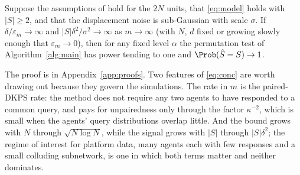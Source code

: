 \begin{proposition}
\label{prop:consistency}
Suppose the assumptions of \citet[Theorem~1]{pkps2026} hold for the $2N$ units, that \eqref{eq:model} holds with $|S|\ge 2$, and that the displacement noise is sub-Gaussian with scale $\sigma$. If $\delta/\varepsilon_m\to\infty$ and $|S|\delta^2/\sigma^2\to\infty$ as $m\to\infty$ (with $N$, $d$ fixed or growing slowly enough that $\varepsilon_m\to 0$), then for any fixed level $\alpha$ the permutation test of Algorithm~\ref{alg:main} has power tending to one and $\Prob(\hat S = S)\to 1$.
\end{proposition}

The proof is in Appendix~\ref{app:proofs}. Two features of \eqref{eq:conc} are worth drawing out because they govern the simulations. The rate in $m$ is the paired-DKPS rate: the method does not require any two agents to have responded to a common query, and pays for unpairedness only through the factor $\kappa^{-2}$, which is small when the agents' query distributions overlap little. And the bound grows with $N$ through $\sqrt{N\log N}$, while the signal grows with $|S|$ through $|S|\delta^2$; the regime of interest for platform data, many agents each with few responses and a small colluding subnetwork, is one in which both terms matter and neither dominates.
